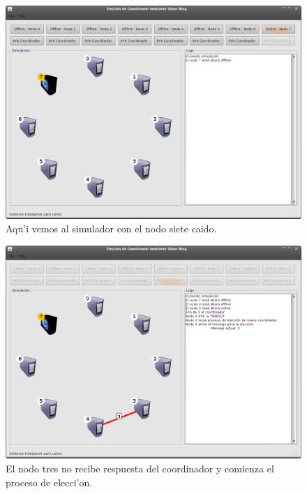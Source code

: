 \begin{figure}[h!]
\centering
 \includegraphics[scale=0.33,keepaspectratio=true]{./imagenes/tokenRing/token1.png}
 \caption{Aqu'i vemos al simulador con el nodo siete caido.}
\end{figure}
\newpage
\begin{figure}[h!]
\centering
 \includegraphics[scale=0.33,keepaspectratio=true]{./imagenes/tokenRing/token2.png}
 \caption{El nodo tres no recibe respuesta del coordinador y comienza el proceso de elecci'on.}
\end{figure}

